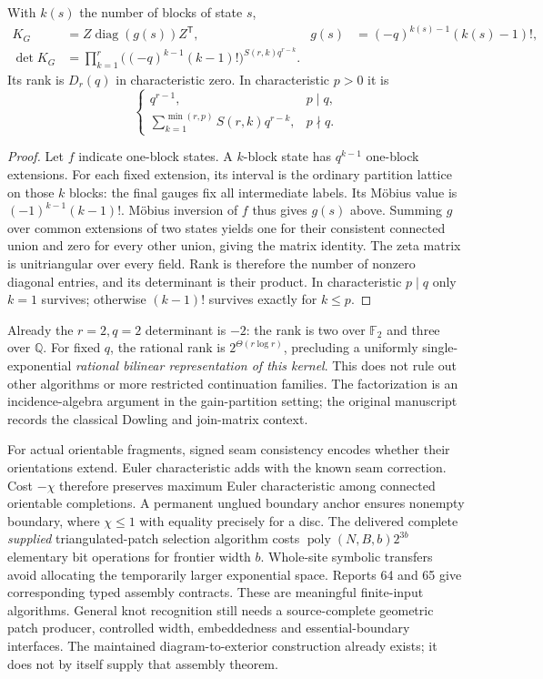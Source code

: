 \begin{proposition}
With $k(s)$ the number of blocks of state $s$,
\begin{align*}
 K_G&=Z\operatorname{diag}(g(s))Z^{\mathsf T},
 & g(s)&=(-q)^{k(s)-1}(k(s)-1)!,\\
 \det K_G&=\prod_{k=1}^r
       \bigl((-q)^{k-1}(k-1)!\bigr)^{S(r,k)q^{r-k}}.
\end{align*}
Its rank is $D_r(q)$ in characteristic zero. In characteristic $p>0$ it is
\[
 \begin{cases}
 q^{r-1},&p\mid q,\\
 \sum_{k=1}^{\min(r,p)}S(r,k)q^{r-k},&p\nmid q.
 \end{cases}
\]
\end{proposition}
\begin{proof}
Let $f$ indicate one-block states. A $k$-block state has $q^{k-1}$ one-block
extensions. For each fixed extension, its interval is the ordinary partition
lattice on those $k$ blocks: the final gauges fix all intermediate labels.
Its M\"obius value is $(-1)^{k-1}(k-1)!$. M\"obius inversion of $f$ thus
gives $g(s)$ above. Summing $g$ over common extensions of two states yields
one for their consistent connected union and zero for every other union,
giving the matrix identity. The zeta matrix is unitriangular over every
field. Rank is therefore the number of nonzero diagonal entries, and its
determinant is their product. In characteristic $p\mid q$ only $k=1$
survives; otherwise $(k-1)!$ survives exactly for $k\le p$.
\end{proof}

Already the $r=2,q=2$ determinant is $-2$: the rank is two over
$\mathbb F_2$ and three over $\mathbb Q$. For fixed $q$, the rational rank
is $2^{\Theta(r\log r)}$, precluding a uniformly single-exponential
\emph{rational bilinear representation of this kernel}. This does not rule
out other algorithms or more restricted continuation families. The
factorization is an incidence-algebra argument in the gain-partition setting;
the original manuscript records the classical Dowling and join-matrix context.

For actual orientable fragments, signed seam consistency encodes whether
their orientations extend. Euler characteristic adds with the known seam
correction. Cost $-\chi$ therefore preserves maximum Euler characteristic
among connected orientable completions. A permanent unglued boundary anchor
ensures nonempty boundary, where $\chi\le1$ with equality precisely for a
disc. The delivered complete \emph{supplied} triangulated-patch selection
algorithm costs $\operatorname{poly}(N,B,b)2^{3b}$ elementary bit operations
for frontier width $b$. Whole-site symbolic transfers avoid allocating the
temporarily larger exponential space. Reports 64 and 65 give corresponding
typed assembly contracts. These are meaningful finite-input algorithms.
General knot recognition still needs a source-complete geometric patch
producer, controlled width, embeddedness and essential-boundary interfaces.
The maintained diagram-to-exterior construction already exists; it does
not by itself supply that assembly theorem.

